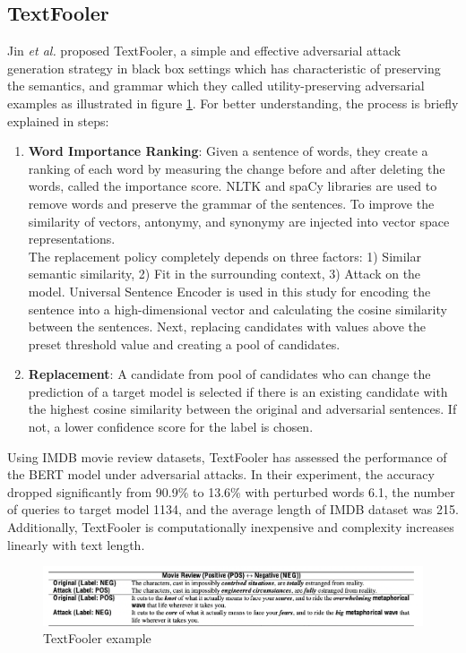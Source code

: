 \documentclass[%
	BCOR=8mm, %
	DIV=12,
	toc=bibliography, %
	toc=listof, %
	oneside, %
	egregdoesnotlikesansseriftitles, %
	]{scrbook}
\begin{document}
\subsection{TextFooler}
\label{subsection:textfooler}
Jin \textit{et al.} \cite{jin_is_2020-1} proposed TextFooler, a simple and effective adversarial attack generation strategy in black box settings which has characteristic of preserving the semantics, and grammar which they called utility-preserving adversarial examples as illustrated in figure \ref{diag:TextFoolerExp}. For better understanding, the process is briefly explained in steps:
\begin{enumerate}
    \item  \textbf{Word Importance Ranking}: Given a sentence of words, they create a ranking of each word by measuring the change before and after deleting the words, called the importance score. NLTK and spaCy libraries are used to remove words and preserve the grammar of the sentences. To improve the similarity of vectors, antonymy, and synonymy are injected into vector space representations.\\
    The replacement policy completely depends on three factors: 1) Similar semantic similarity, 2) Fit in the surrounding context, 3) Attack on the model. Universal Sentence Encoder \cite{cer_universal_2018} is used in this study for encoding the sentence into a high-dimensional vector and calculating the cosine similarity between the sentences. Next, replacing candidates with values above the preset threshold value and creating a pool of candidates.
    \item \textbf{Replacement}: A candidate from pool of candidates who can change the prediction of a target model is selected if there is an existing candidate with the highest cosine similarity between the original and adversarial sentences. If not, a lower confidence score for the label is chosen.
\end{enumerate}
Using IMDB movie review datasets, TextFooler has assessed the performance of the BERT model under adversarial attacks. In their experiment, the accuracy dropped significantly from 90.9\% to 13.6\% with perturbed words 6.1, the number of queries to target model 1134, and the average length of IMDB dataset was 215. Additionally, TextFooler is computationally inexpensive and complexity increases linearly with text length. 
\begin{figure}[H]
    \centering
    \includegraphics[width=1.0\textwidth]{img/textfooler_example.png}
    \caption[Example of TextFooler]{TextFooler example  \cite{jia_certified_2019} }
    \label{diag:TextFoolerExp}
\end{figure}
\end{document}
